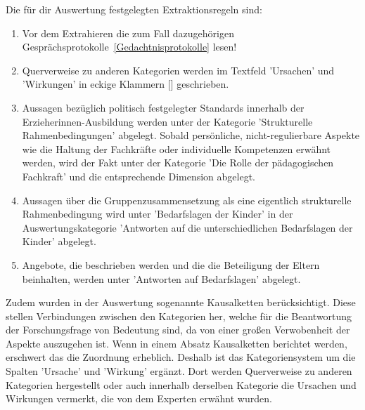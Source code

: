 Die für dir Auswertung festgelegten Extraktionsregeln sind:
\begin{enumerate}
\item Vor dem Extrahieren die zum Fall dazugehörigen Gesprächsprotokolle~\ref{Gedachtnisprotokolle} lesen!
\item Querverweise zu anderen Kategorien werden im Textfeld 'Ursachen' und 'Wirkungen' in eckige Klammern [] geschrieben.
\item Aussagen bezüglich politisch festgelegter Standards innerhalb der Erzieherinnen-Ausbildung werden unter der Kategorie 'Strukturelle Rahmenbedingungen' abgelegt. Sobald persönliche, nicht-regulierbare Aspekte wie die Haltung der Fachkräfte oder individuelle Kompetenzen erwähnt werden, wird der Fakt unter der Kategorie 'Die Rolle der pädagogischen Fachkraft' und die entsprechende Dimension abgelegt.
\item Aussagen über die Gruppenzusammensetzung als eine eigentlich strukturelle Rahmenbedingung wird unter 'Bedarfslagen der Kinder' in der Auswertungskategorie 'Antworten auf die unterschiedlichen Bedarfslagen der Kinder' abgelegt.
\item Angebote, die beschrieben werden und die die Beteiligung der Eltern beinhalten, werden  unter 'Antworten auf Bedarfslagen' abgelegt.
\end{enumerate}

Zudem wurden in der Auswertung sogenannte Kausalketten berücksichtigt. Diese stellen Verbindungen zwischen den Kategorien her, welche für die Beantwortung der Forschungsfrage von Bedeutung sind, da von einer großen Verwobenheit der Aspekte auszugehen ist. Wenn in einem Absatz Kausalketten berichtet werden, erschwert das die Zuordnung erheblich. Deshalb ist das Kategoriensystem um die Spalten 'Ursache' und 'Wirkung' ergänzt. Dort werden Querverweise zu anderen Kategorien hergestellt oder auch innerhalb derselben Kategorie die Ursachen und Wirkungen vermerkt, die von dem Experten erwähnt wurden.


